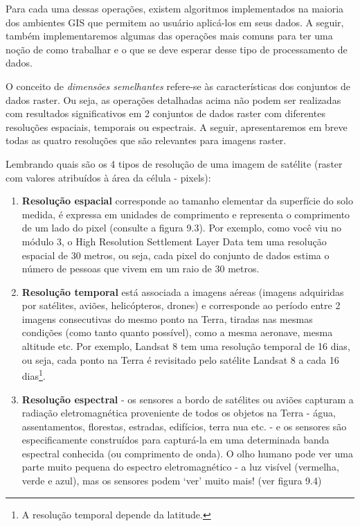 \documentclass[
]{book}
\begin{document}
Para cada uma dessas operações, existem algoritmos implementados na maioria dos ambientes GIS que permitem ao usuário aplicá-los em seus dados. A seguir, também implementaremos algumas das operações mais comuns para ter uma noção de como trabalhar e o que se deve esperar desse tipo de processamento de dados.

O conceito de \emph{dimensões semelhantes} refere-se às características dos conjuntos de dados raster. Ou seja, as operações detalhadas acima não podem ser realizadas com resultados significativos em 2 conjuntos de dados raster com diferentes resoluções espaciais, temporais ou espectrais. A seguir, apresentaremos em breve todas as quatro resoluções que são relevantes para imagens raster.

Lembrando quais são os 4 tipos de resolução de uma imagem de satélite (raster com valores atribuídos à área da célula - pixels):

\begin{enumerate}
\def\labelenumi{\arabic{enumi}.}
\item
  \textbf{Resolução espacial} corresponde ao tamanho elementar da superfície do solo medida, é expressa em unidades de comprimento e representa o comprimento de um lado do pixel (consulte a figura 9.3). Por exemplo, como você viu no módulo 3, o High Resolution Settlement Layer Data tem uma resolução espacial de 30 metros, ou seja, cada pixel do conjunto de dados estima o número de pessoas que vivem em um raio de 30 metros.
\item
  \textbf{Resolução temporal} está associada a imagens aéreas (imagens adquiridas por satélites, aviões, helicópteros, drones) e corresponde ao período entre 2 imagens consecutivas do mesmo ponto na Terra, tiradas nas mesmas condições (como tanto quanto possível), como a mesma aeronave, mesma altitude etc. Por exemplo, Landsat 8 tem uma resolução temporal de 16 dias, ou seja, cada ponto na Terra é revisitado pelo satélite Landsat 8 a cada 16 dias\footnote{A resolução temporal depende da latitude.}.
\item
  \textbf{Resolução espectral} - os sensores a bordo de satélites ou aviões capturam a radiação eletromagnética proveniente de todos os objetos na Terra - água, assentamentos, florestas, estradas, edifícios, terra nua etc. - e os sensores são especificamente construídos para capturá-la em uma determinada banda espectral conhecida (ou comprimento de onda). O olho humano pode ver uma parte muito pequena do espectro eletromagnético - a luz visível (vermelha, verde e azul), mas os sensores podem `ver' muito mais! (ver figura 9.4)
\end{enumerate}
\end{document}
